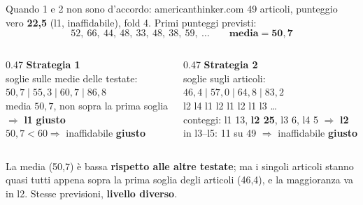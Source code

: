 \documentclass[aspectratio=169]{beamer}
\newcommand{\hl}[1]{\textbf{#1}}
\newcommand{\si}{\textcolor{verde}{\textbf{giusto}}}
\newcommand{\errore}[1]{\textcolor{rosso}{\textbf{#1}}}
\begin{document}
\begin{frame}{Quando 1 e 2 non sono d'accordo: americanthinker.com}
  \small
  49 articoli, punteggio vero \hl{22,5} (l1, inaffidabile), fold 4. Primi punteggi previsti:
  \[ 52,\ 66,\ 44,\ 48,\ 33,\ 48,\ 38,\ 59,\ \ldots \qquad \textbf{media} = \mathbf{50{,}7} \]
  \begin{columns}[T]
    \begin{column}{0.47\textwidth}
      \hl{Strategia 1}\\[0.2em]
      soglie sulle medie delle testate:\\
      $50{,}7 \mid 55{,}3 \mid 60{,}7 \mid 86{,}8$\\[0.2em]
      media $50{,}7$, non sopra la prima soglia\\
      $\Rightarrow$ \textbf{l1} \si\\[0.2em]
      $50{,}7 < 60 \Rightarrow$ inaffidabile \si
    \end{column}
    \begin{column}{0.47\textwidth}
      \hl{Strategia 2}\\[0.2em]
      soglie sugli articoli:\\
      $46{,}4 \mid 57{,}0 \mid 64{,}8 \mid 83{,}2$\\[0.2em]
      l2 l4 l1 l2 l1 l2 l1 l3 \ldots\\
      conteggi: l1 13, \hl{l2 25}, l3 6, l4 5 $\Rightarrow$ \errore{l2}\\[0.2em]
      in l3--l5: 11 su 49 $\Rightarrow$ inaffidabile \si
    \end{column}
  \end{columns}
  \vspace{0.8em}
  \raggedright
  La media (50,7) \`e bassa \hl{rispetto alle altre testate}; ma i singoli articoli stanno quasi tutti appena sopra la prima
  soglia degli articoli (46,4), e la maggioranza va in l2. Stesse previsioni, \hl{livello diverso}.
\end{frame}
\end{document}
